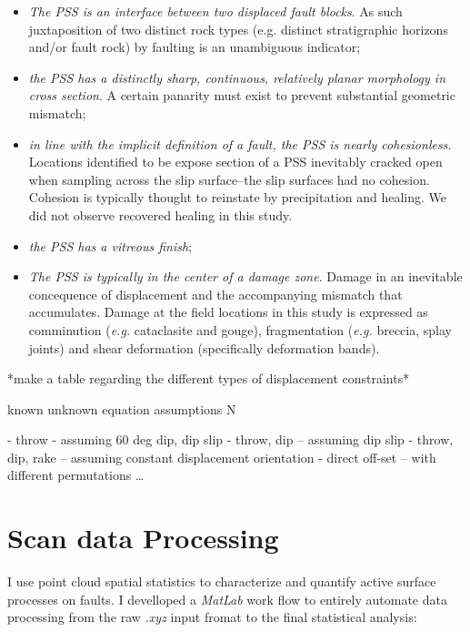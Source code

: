 \documentclass[12pt,a4paper]{article}
\begin{document}
\begin{itemize}

	\item \textit{The PSS is an interface between two displaced fault blocks}. As such juxtaposition of two distinct rock types (e.g. distinct stratigraphic horizons and/or fault rock) by faulting is an unambiguous indicator;
	
	\item \textit{the PSS has a distinctly sharp, continuous, relatively planar morphology in cross section}. A certain panarity must exist to prevent substantial geometric mismatch;
	
	\item \textit{in line with the implicit definition of a fault, the PSS is nearly cohesionless.} Locations identified to be expose section of a PSS inevitably cracked open when sampling across the slip surface--the slip surfaces had no cohesion. Cohesion is typically thought to reinstate by precipitation and healing. We did not observe recovered healing in this study.
	
	\item \textit{the PSS has a vitreous finish};
	
	\item \textit{The PSS is typically in the center of a damage zone}. Damage in an inevitable concequence of displacement and the accompanying mismatch that accumulates. Damage at the field locations in this study is expressed as comminution (\textit{e.g.} cataclasite and gouge), fragmentation (\textit{e.g.} breccia, splay joints) and shear deformation (specifically deformation bands).
	
\end{itemize}

*make a table regarding the different types of displacement constraints*

known 		unknown 	equation 	assumptions		N

- throw - assuming 60 deg dip, dip slip 
- throw, dip – assuming dip slip 
- throw, dip, rake – assuming constant displacement orientation
- direct off-set – with different permutations …

	\section{Scan data Processing}

I use point cloud spatial statistics to characterize and quantify active surface processes on faults. I develloped a \textit{MatLab} work flow to entirely automate data processing from the raw \textit{.xyz} input fromat to the final statistical analysis:
\end{document}
